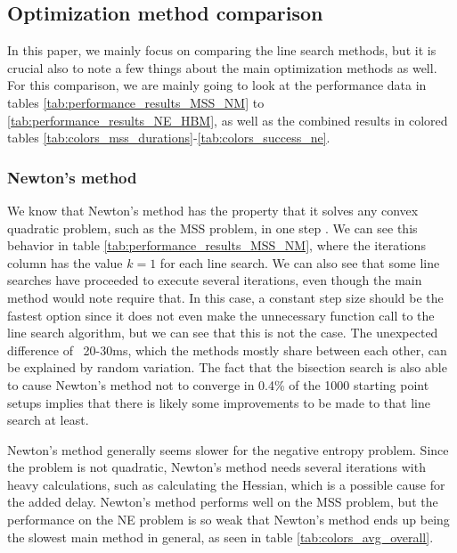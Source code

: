 \documentclass[english, 12pt, a4paper, sci, utf8, a-1b, online, table]{aaltothesis}
\begin{document}

\subsection{Optimization method comparison}

In this paper, we mainly focus on comparing the line search methods, but it is crucial also to note a few things about the main optimization methods as well. For this comparison, we are mainly going to look at the performance data in tables \ref{tab:performance_results_MSS_NM} to \ref{tab:performance_results_NE_HBM}, as well as the combined results in colored tables \ref{tab:colors_mss_durations}-\ref{tab:colors_success_ne}.

\subsubsection*{Newton's method}

We know that Newton's method has the property that it solves any convex quadratic problem, such as the MSS problem, in one step \cite{book:convex_optimization}. We can see this behavior in table \ref{tab:performance_results_MSS_NM}, where the iterations column has the value $k = 1$ for each line search. We can also see that some line searches have proceeded to execute several iterations, even though the main method would note require that. In this case, a constant step size should be the fastest option since it does not even make the unnecessary function call to the line search algorithm, but we can see that this is not the case. The unexpected difference of ~20-30ms, which the methods mostly share between each other, can be explained by random variation. The fact that the bisection search is also able to cause Newton's method not to converge in 0.4\% of the 1000 starting point setups implies that there is likely some improvements to be made to that line search at least. 

Newton's method generally seems slower for the negative entropy problem. Since the problem is not quadratic, Newton's method needs several iterations with heavy calculations, such as calculating the Hessian, which is a possible cause for the added delay. Newton's method performs well on the MSS problem, but the performance on the NE problem is so weak that Newton's method ends up being the slowest main method in general, as seen in table \ref{tab:colors_avg_overall}.
\end{document}
